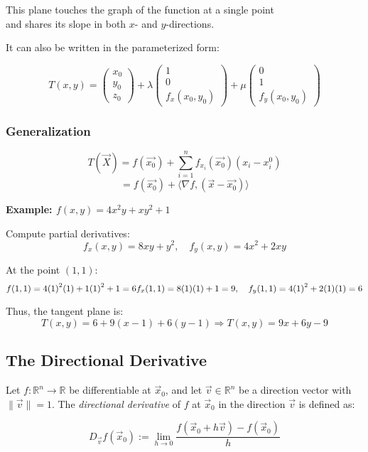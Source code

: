This plane touches the graph of the function at a single point\\
and shares its slope in both \( x \)- and \( y \)-directions.

It can also be written in the parameterized form:

\[
T(x,y) = \begin{pmatrix} x_0\\ y_0\\ z_0\end{pmatrix} + \lambda 
\begin{pmatrix} 1\\ 0 \\ f_x(x_0,y_0)\end{pmatrix} + \mu \begin{pmatrix}
0 \\ 1 \\ f_y(x_0, y_0)
\end{pmatrix}
\]

\subsubsection{Generalization}
\[
T(\vec{X}) = f(\vec{x_0}) + \sum_{i = 1}^{n} f_{x_i}(\vec{x_0})(x_i - x_{i}^0)
\]
\[
 = f(\vec{x_0}) + \langle \nabla f, (\vec{x} - \vec{x_0})\rangle
\]

\textbf{Example: \( f(x, y) = 4x^2y + xy^2 + 1 \)}

Compute partial derivatives:
\[
f_x(x, y) = 8xy + y^2, \quad f_y(x, y) = 4x^2 + 2xy
\]

At the point \( (1, 1) \):
\[
f(1, 1) = 4{(1)}^2(1) + 1{(1)}^2 + 1 = 6 \\
f_x(1, 1) = 8(1)(1) + 1 = 9, \quad f_y(1, 1) = 4{(1)}^2 + 2(1)(1) = 6
\]

Thus, the tangent plane is:
\[
T(x, y) = 6 + 9(x - 1) + 6(y - 1)
\Rightarrow T(x, y) = 9x + 6y - 9
\]

\subsection{The Directional Derivative}

Let \( f : \mathbb{R}^n \to \mathbb{R} \) be differentiable at \( \vec{x}_0 \), 
and let \( \vec{v} \in \mathbb{R}^n \) be a direction vector with \( \|\vec{v}\| = 1 \). The 
\emph{directional derivative} of \( f \) at \( \vec{x}_0 \) in the direction \( \vec{v} \) is defined as:

\[
D_{\vec{v}}f(\vec{x}_0) := \lim_{h \to 0} \frac{f(\vec{x}_0 + h\vec{v}) - f(\vec{x}_0)}{h}
\]

